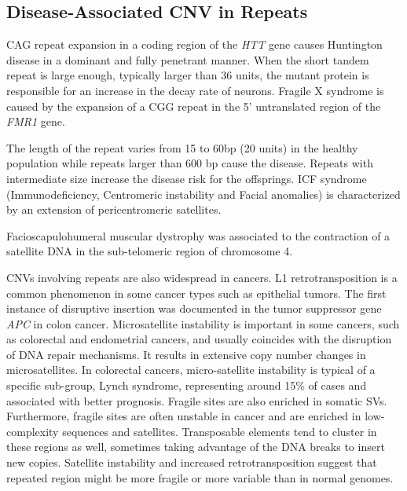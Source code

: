 \subsection{Disease-Associated CNV in Repeats}

CAG repeat expansion in a coding region of the {\it HTT} gene causes Huntington disease in a dominant and fully penetrant manner\cite{MacDonald1993,Andrew1993}.
When the short tandem repeat is large enough, typically larger than 36 units, the mutant protein is responsible for an increase in the decay rate of neurons.
Fragile X syndrome is caused by the expansion of a CGG repeat in the 5' untranslated region of the {\it FMR1} gene\cite{Verkerk1991}.
\begin{comment}
  Fragile X syndrome causes Mental Retardation.
\end{comment}
The length of the repeat varies from 15 to 60bp (20 units) in the healthy population while repeats larger than 600 bp cause the disease.
Repeats with intermediate size increase the disease risk for the offsprings.
ICF syndrome (Immunodeficiency, Centromeric instability and Facial anomalies) is characterized by an extension of pericentromeric satellites.
\begin{comment}
  Hypomethylation of these satellites is thought to be the cause for this instability on chromosome 1, 9 and 16\cite{Jeanpierre1993}.
\end{comment}
Facioscapulohumeral muscular dystrophy was associated to the contraction of a satellite DNA in the sub-telomeric region of chromosome 4\cite{Rich2014}.
\begin{comment}
  Healthy individuals have 11-150 units while disease have 1-10 (no repeat doesn't cause the disease).
  D4Z4 repeats is 3303 bp long and contains an ORF (1173 bp) with 2 homeobox domains.
\end{comment}

CNVs involving repeats are also widespread in cancers.
L1 retrotransposition is a common phenomenon in some cancer types such as epithelial tumors\cite{Lee2012b,Tubio2014,Burns2017}.
The first instance of disruptive insertion was documented in the tumor suppressor gene {\it APC} in colon cancer\cite{Miki1992}.
Microsatellite instability is important in some cancers, such as colorectal and endometrial cancers, and usually coincides with the disruption of DNA repair mechanisms\cite{Kim2013}.
It results in extensive copy number changes in microsatellites.
In colorectal cancers, micro-satellite instability is typical of a specific sub-group, Lynch syndrome, representing around 15\% of cases and associated with better prognosis\cite{DelaChapelle2010}.
Fragile sites are also enriched in somatic SVs.
Furthermore, fragile sites are often unstable in cancer and are enriched in low-complexity sequences and satellites\cite{Fungtammasan2012,Durkin2007}.
Transposable elements tend to cluster in these regions as well, sometimes taking advantage of the DNA breaks to insert new copies.
Satellite instability and increased retrotransposition suggest that repeated region might be more fragile or more variable than in normal genomes.

